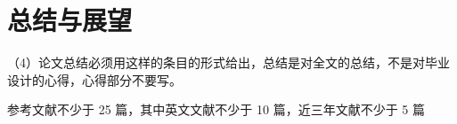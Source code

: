 \section{总结与展望}
（4）论文总结必须用这样的条目的形式给出，总结是对全文的总结，不是对毕业设计的心得，心得部分不要写。

参考文献不少于 25 篇，其中英文文献不少于 10 篇，近三年文献不少于 5 篇